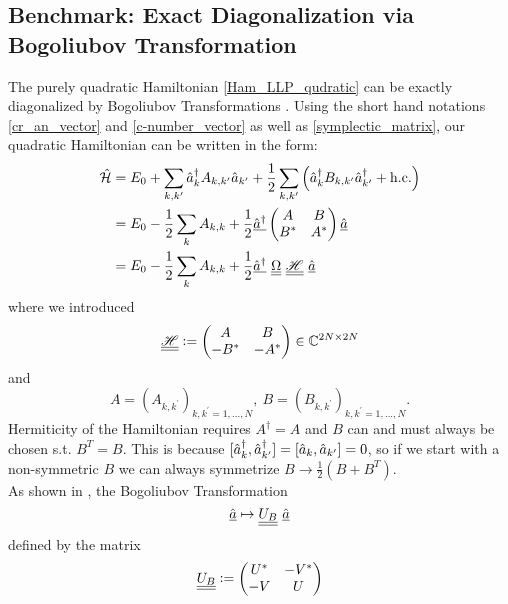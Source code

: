 \subsection{Benchmark: Exact Diagonalization via Bogoliubov Transformation}
The purely quadratic Hamiltonian \ref{Ham_LLP_qudratic} can be exactly diagonalized by Bogoliubov Transformations \cite{PracticalTraining,1980ZPhyB..38..271H,PhysRevA.98.033610}. Using the short hand notations \ref{cr_an_vector} and \ref{c-number_vector} as well as \ref{symplectic_matrix}, our quadratic Hamiltonian can be written in the form:
\begin{align}
\ham &= E_0 + \Sum_{k,k^\prime}\CR_k A_{k,k^\prime}\AN_{k^\prime}+\frac12\Sum_{k,k^\prime}\left(\CR_k B_{k,k^\prime}\CR_{k^\prime}+\mathrm{h.c.}\right)\\
&=E_0-\frac12\Sum_k A_{k,k}+\frac12\underline\CR\begin{pmatrix}A & B\\ B^* & A^*\end{pmatrix}\underline\AN\\
&=E_0-\frac12\Sum_k A_{k,k}+\frac12\underline{\CR}\ {\underline{\underline{\Omega}}}\ {\underline{\underline{\mathscr{H}}}}\ {\underline{\AN}}
\end{align}
where we introduced
\begin{equation}
{\underline{\underline{\mathscr{H}}}}\vcentcolon=\begin{pmatrix}A & B\\ -B^* & -A^*\end{pmatrix}\in\mathbb{C}^{2N\times 2N}
\end{equation}
and
\begin{equation}
A=\left(A_{k,k^\prime}\right)_{k,k^\prime=1,...,N},\ B=\left(B_{k,k^\prime}\right)_{k,k^\prime=1,...,N}.
\end{equation}
Hermiticity of the Hamiltonian requires $A^\dagger=A$ and $B$ can and must always be chosen s.t. $B^T=B$. This is because $[\hat a^\dagger_k,\hat a^\dagger_{k^\prime}]=[\hat a_k,\hat a_{k^\prime}]=0$, so if we start with a non-symmetric $B$ we can always symmetrize $B\rightarrow \frac12\left(B+B^T\right)$.\\
As shown in \cite{PracticalTraining}, the Bogoliubov Transformation
\begin{equation}\label{Bogoliubov Transformation Def} \underline\AN\mapsto  \underline{\underline{U_B}}\ \underline\AN\end{equation}
defined by the matrix 
\begin{equation}\label{symplectic_U_B}
\underline{\underline{U_B}}\vcentcolon= \begin{pmatrix}U^* & -V^*\\ -V & U\end{pmatrix}
\end{equation}
